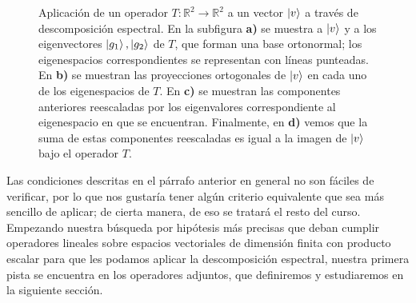 \documentclass[12pt,dvipsnames]{article}
\begin{document}
\begin{figure}[h!]
\hspace{3mm}
\caption{Aplicación de un operador $T:\mathbb{R}^2\to \mathbb{R}^2$ a un vector $\ket{v}$ a través de descomposición espectral. En la subfigura \textbf{a)} se muestra a $\ket{v}$ y a los eigenvectores $\ket{g_1},\ket{g_2}$ de $T$, que forman una base ortonormal; los eigenespacios correspondientes se representan con líneas punteadas. En \textbf{b)} se muestran las proyecciones ortogonales de $\ket{v}$ en cada uno de los eigenespacios de $T$. En \textbf{c)} se muestran las componentes anteriores reescaladas por los eigenvalores correspondiente al eigenespacio en que se encuentran. Finalmente, en \textbf{d)} vemos que la suma de estas componentes reescaladas es igual a la imagen de $\ket{v}$ bajo el operador $T$.}
    \label{fig:8}
\end{figure}

\vspace{3mm}
Las condiciones descritas en el párrafo anterior en general no son fáciles de verificar, por lo que nos gustaría tener algún criterio equivalente que sea más sencillo de aplicar; de cierta manera, de eso se tratará el resto del curso. Empezando nuestra búsqueda por hipótesis más precisas que deban cumplir operadores lineales sobre espacios vectoriales de dimensión finita con producto escalar para que les podamos aplicar la descomposición espectral, nuestra primera pista se encuentra en los operadores adjuntos, que definiremos y estudiaremos en la siguiente sección.
\end{document}
